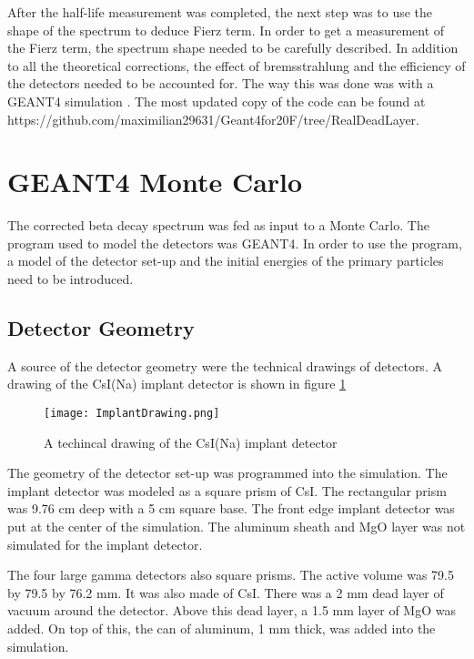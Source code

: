 

After the half-life measurement was completed, the next step was to use the shape of the spectrum to deduce Fierz term. 
In order to get a measurement of the Fierz term, the spectrum shape needed to be carefully described.
In addition to all the theoretical corrections, the effect of bremsstrahlung and the efficiency of the detectors needed to be accounted for.
The way this was done was with a GEANT4 simulation \cite{Ago03}.
The most updated copy of the code can be found at https://github.com/maximilian29631/Geant4for20F/tree/RealDeadLayer. 


\section{GEANT4 Monte Carlo}
The corrected beta decay spectrum was fed as input to a Monte Carlo.
The program used to model the detectors was GEANT4.
In order to use the program, a model of the detector set-up and the initial energies of the primary particles need to be introduced.  

\subsection{Detector Geometry}
A source of the detector geometry were the technical drawings of detectors. 
A drawing of the CsI(Na) implant detector is shown in figure \ref{fig:ImplantTech}

\begin{figure}[!htb]
	\centerline{\texttt{[image: ImplantDrawing.png]}}
	\caption{A techincal drawing of the CsI(Na) implant detector}
	\label{fig:ImplantTech}
\end{figure}


The geometry of the detector set-up was programmed into the simulation.
The implant detector was modeled as a square prism of CsI.
The rectangular prism was 9.76 cm deep with a 5 cm square base.
The front edge implant detector was put at the center of the simulation.
The aluminum sheath and MgO layer was not simulated for the implant detector.

The four large gamma detectors also square prisms.
The active volume was 79.5 by 79.5 by 76.2 mm.
It was also made of CsI.
There was a 2 mm dead layer of vacuum around the detector.
Above this dead layer, a 1.5 mm layer of MgO was added.
On top of this, the can of aluminum, 1 mm thick, was added into the simulation.

